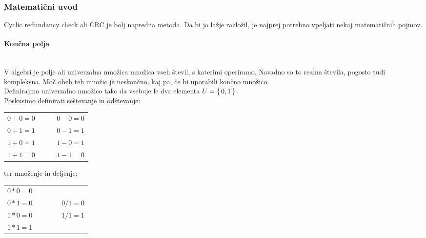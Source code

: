 \documentclass[12pt]{article}
\begin{document}
        \subsubsection{Matematični uvod}
            Cyclic redundancy check ali CRC je bolj napredna metoda. Da bi jo 
            lažje razložil, je najprej potrebno vpeljati nekaj matematičnih 
            pojmov.
            \paragraph{Končna polja} \label{sec:polja} \mbox{}\\
                V algebri je polje ali univerzalna množica množica vseh števil,
                s katerimi operiramo. Navadno so to realna števila, pogosto tudi
                kompleksna. Moč obeh teh množic je neskončno, kaj pa, če bi
                uporabili končno množico. \\
                Definirajmo univerzalno množico tako 
                da vsebuje le dva elementa $U = \set{0, 1}$.\\
                Poskusimo definirati seštevanje in odštevanje:
                \begin{table}[h!]
                    \centering
                    \begin{tabular}{l p{0.2\linewidth}}
                        $0 + 0 = 0$  & $0 - 0 = 0$ \\
                        $0 + 1 = 1$  & $0 - 1 = 1$ \\
                        $1 + 0 = 1$  & $1 - 0 = 1$ \\
                        $1 + 1 = 0$  & $1 - 1 = 0$ \\
                    \end{tabular}
                \end{table}

                ter množenje in deljenje:
                \begin{table}[h!]
                    \centering
                    \begin{tabular}{l p{0.2\linewidth}}
                        $0 * 0 = 0$  &  \\
                        $0 * 1 = 0$  & $0 / 1 = 0$\\
                        $1 * 0 = 0$  & $1 / 1 = 1$\\
                        $1 * 1 = 1$  &  \\
                    \end{tabular}
                \end{table}
\end{document}
